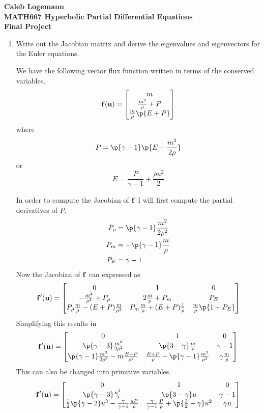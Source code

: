 \documentclass[11pt, oneside]{article}
\begin{document}
\noindent \textbf{\Large{Caleb Logemann \\
MATH667 Hyperbolic Partial Differential Equations \\
Final Project
}}

%
\begin{enumerate}
  \item %
    Write out the Jacobian matrix and derive the eigenvalues and eigenvectors
    for the Euler equations.

    We have the following vector flux function written in terms of the conserved variables.
    \[
      \v{f}(\v{u}) =
      \begin{bmatrix}
        m \\
        \frac{m^2}{\rho} + P \\
        \frac{m}{\rho}\p{E + P}
      \end{bmatrix}
    \]
    where
    \[
      P = \p{\gamma - 1}\p{E - \frac{m^2}{2\rho}}
    \]
    or
    \[
      E = \frac{P}{\gamma - 1} + \frac{\rho u^2}{2}
    \]

    In order to compute the Jacobian of $\mathbf{f}$ I will first compute the partial derivatives of $P$.
    \begin{align*}
      P_{\rho} &= \p{\gamma - 1} \frac{m^2}{2 \rho^2} \\
      P_m &= -\p{\gamma - 1}\frac{m}{\rho} \\
      P_E &= \gamma - 1
    \end{align*}
    Now the Jacobian of $\mathbf{f}$ can expressed as
    \[
      \v{f}'(\v{u}) =
      \begin{bmatrix}
        0 & 1 & 0 \\
        -\frac{m^2}{\rho^2} + P_{\rho} & 2 \frac{m}{\rho} + P_m & P_E \\
        P_{\rho} \frac{m}{\rho} - (E + P)\frac{m}{\rho^2} & P_m \frac{m}{\rho} + (E + P) \frac{1}{\rho} & \frac{m}{p}\p{1 + P_E}
      \end{bmatrix}
    \]
    Simplifying this results in
    \[
      \v{f}'(\v{u}) =
      \begin{bmatrix}
        0 & 1 & 0 \\
        \p{\gamma - 3} \frac{m^2}{2 \rho^2} & \p{3 - \gamma}\frac{m}{\rho} & \gamma - 1 \\
        \p{\gamma - 1} \frac{m^3}{2 \rho^3} - m\frac{E + P}{\rho^2} & \frac{E + P}{\rho} - \p{\gamma - 1}\frac{m^2}{\rho^2}  & \gamma\frac{m}{p}
      \end{bmatrix}
    \]
    This can also be changed into primitive variables.
    \[
      \v{f}'(\v{u}) =
      \begin{bmatrix}
        0 & 1 & 0 \\
        \p{\gamma - 3} \frac{u^2}{2} & \p{3 - \gamma}u & \gamma - 1 \\
        \frac{1}{2}\p{\gamma - 2} u^3 - \frac{\gamma}{\gamma - 1}\frac{uP}{\rho} & \frac{\gamma}{\gamma - 1}\frac{P}{\rho} + \p{\frac{3}{2} - \gamma}u^2  & \gamma u
      \end{bmatrix}
    \]


\end{enumerate}
\end{document}
